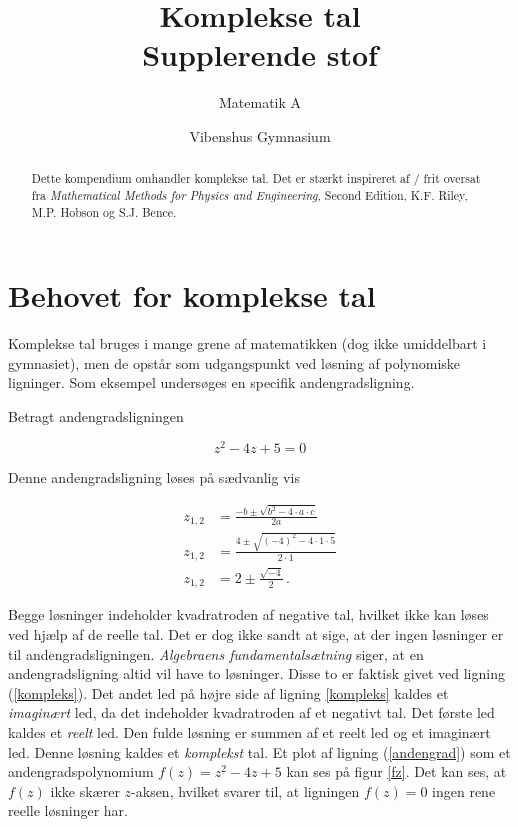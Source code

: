 \documentclass[a4paper, 12pt,titlepage]{article}
\author{Matematik A}
\date{Vibenshus Gymnasium}
\title{Komplekse tal\\\medskip
\large Supplerende stof}
\begin{document}
\maketitle
\tableofcontents

\begin{abstract}
Dette kompendium omhandler komplekse tal. Det er stærkt inspireret af / frit oversat fra \emph{Mathematical Methods for Physics and Engineering}, Second Edition, K.F. Riley, M.P. Hobson og S.J. Bence.
\end{abstract}

\section{Behovet for komplekse tal}
\label{sec:org593cd34}

Komplekse tal bruges i mange grene af matematikken (dog ikke umiddelbart i gymnasiet), men de opstår som udgangspunkt ved løsning af polynomiske ligninger. Som eksempel undersøges en specifik andengradsligning.

Betragt andengradsligningen

\begin{equation}
\label{andengrad}
    z^2 -4 z +5 = 0 
\end{equation}

Denne andengradsligning løses på sædvanlig vis

\begin{align}
\label{kompleks}
    z_{1,2} &= \frac{-b \pm \sqrt{b^2 - 4 \cdot a \cdot c}}{2 a} \nonumber\\
    z_{1,2} &= \frac{4 \pm \sqrt{\left(-4\right)^2 - 4 \cdot 1 \cdot 5}}{2 \cdot 1} \nonumber\\
    z_{1,2} &= 2 \pm \frac{\sqrt{-4}}{2} \,.
\end{align}

Begge løsninger indeholder kvadratroden af negative tal, hvilket ikke kan løses ved hjælp af de reelle tal. Det er dog ikke sandt at sige, at der ingen løsninger er til andengradsligningen. \emph{Algebraens fundamentalsætning} siger, at en andengradsligning altid vil have to løsninger. Disse to er faktisk givet ved ligning (\ref{kompleks}). Det andet led på højre side af ligning \eqref{kompleks} kaldes et \emph{imaginært} led, da det indeholder kvadratroden af et negativt tal. Det første led kaldes et \emph{reelt} led. Den fulde løsning er summen af et reelt led og et imaginært led. Denne løsning kaldes et \emph{komplekst} tal. Et plot af ligning (\ref{andengrad}) som et andengradspolynomium \(f(z)=z^2-4 z +5\) kan ses på figur \ref{fz}. Det kan ses, at \(f(z)\) ikke skærer \(z\)​-aksen, hvilket svarer til, at ligningen \(f(z)=0\) ingen rene reelle løsninger har.
\end{document}
